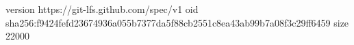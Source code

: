 version https://git-lfs.github.com/spec/v1
oid sha256:f9424fefd23674936a055b7377da5f88cb2551c8ea43ab99b7a08f3c29ff6459
size 22000
